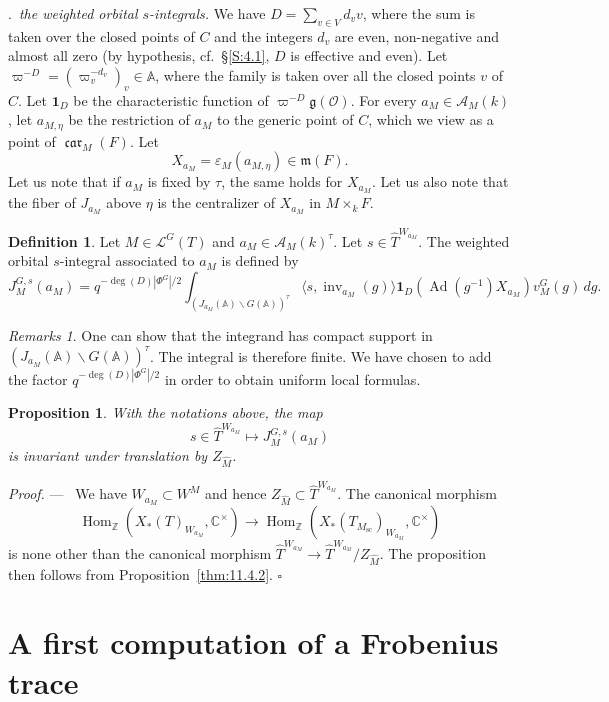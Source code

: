 \documentclass[12pt,a4paper,oneside,english,leqno]{smfart}
\makeatletter
\numberwithin{equation}{subsection}
\newcounter{theo}
\numberwithin{theo}{subsection}
\newenvironment{paragr}[1][]{\medskip\refstepcounter{subsection}%
  \par\noindent\hspace*{\parindent}\thesubsection.\ \emph{#1}%
  \@ifundefined{@empty}{}{}\ignorespaces}{\medskip}
\theoremstyle{plain}
\newtheorem{proposition}[theo]{Proposition}
\theoremstyle{definition}
\newtheorem{definition}[theo]{Definition}
\theoremstyle{remark}
\newtheorem{remarks}[theo]{Remarks}
\newenvironment{preuve}[1][]{\medskip\noindent\textit{Proof.} #1 ---\ }%
  {\hfill\ensuremath{\square}\medskip}
\DeclareMathOperator{\Ad}{Ad}
\DeclareMathOperator{\scnx}{sc}
\DeclareMathOperator{\Hom}{Hom}
\DeclareMathOperator{\inv}{inv}
\DeclareMathOperator{\car}{\mathfrak{car}}
\newcommand{\ZZ}{\mathbb{Z}}
\newcommand{\AAA}{\mathbb{A}}
\newcommand{\CC}{\mathbb{C}}
\newcommand{\oc}{\mathcal{O}}
\newcommand{\lc}{\mathcal{L}}
\newcommand{\Ac}{\mathcal{A}}
\newcommand{\Tc}{\widehat{T}}
\newcommand{\Mc}{\widehat{M}}
\newcommand{\ggo}{\mathfrak{g}}
\newcommand{\mgo}{\mathfrak{m}}
\newcommand{\back}{\backslash}
\newcommand{\bg}{\langle}
\newcommand{\bd}{\rangle}
\makeatother
\begin{document}
\begin{paragr}[the weighted orbital $s$-integrals.]\label{S:11.7}
We have $D=\sum_{v\in V}d_vv$, where the sum is taken over the closed points of $C$ and the integers $d_v$ are even, non-negative and almost all zero (by hypothesis, cf.\ \S\ref{S:4.1}, $D$ is effective and even). Let $\varpi^{-D}=(\varpi_v^{-d_v})_v\in\AAA$, where the family is taken over all the closed points $v$ of $C$. Let $\mathbf{1}_D$ be the characteristic function of $\varpi^{-D}\ggo(\oc)$. For every $a_M\in\Ac_M(k)$, let $a_{M,\eta}$ be the restriction of $a_M$ to the generic point of $C$, which we view as a point of $\car_M(F)$. Let
$$
X_{a_M}=\varepsilon_M(a_{M,\eta})\in\mgo(F).
$$
Let us note that if $a_M$ is fixed by $\tau$, the same holds for $X_{a_M}$. Let us also note that the fiber of $J_{a_M}$ above $\eta$ is the centralizer of $X_{a_M}$ in $M\times_kF$.

\begin{definition}\label{thm:11.7.1}
Let $M\in\lc^G(T)$ and $a_M\in\Ac_M(k)^\tau$. Let $s\in\Tc^{W_{a_M}}$. The weighted orbital $s$-integral associated to $a_M$ is defined by
$$
J_M^{G,s}(a_M)=q^{-\deg(D)|\Phi^G|/2} \int_{(J_{a_M}(\AAA)\back G(\AAA))^\tau}\bg s,\inv_{a_M}(g)\bd \mathbf{1}_D(\Ad(g^{-1})X_{a_M})v_M^G(g)\,dg.
$$
\end{definition}

\begin{remarks}\label{thm:11.7.2}
One can show that the integrand has compact support in $(J_{a_M}(\AAA)\back G(\AAA))^\tau$. The integral is therefore finite. We have chosen to add the factor $q^{-\deg(D)|\Phi^G|/2}$ in order to obtain uniform local formulas.
\end{remarks}

\begin{proposition}\label{thm:11.7.3}
With the notations above, the map
$$
s\in\Tc^{W_{a_M}}\mapsto J_M^{G,s}(a_M)
$$
is invariant under translation by $Z_{\Mc}$.
\end{proposition}

\begin{preuve}
We have $W_{a_M}\subset W^M$ and hence $Z_{\Mc}\subset\Tc^{W_{a_M}}$. The canonical morphism
$$
\Hom_\ZZ(X_*(T)_{W_{a_M}},\CC^\times)\to \Hom_\ZZ(X_*(T_{M_{\scnx}})_{W_{a_M}},\CC^\times)
$$
is none other than the canonical morphism $\Tc^{W_{a_M}}\to\Tc^{W_{a_M}}/Z_{\Mc}$. The proposition then follows from Proposition~\ref{thm:11.4.2}.
\end{preuve}
\end{paragr}
\section{A first computation of a Frobenius trace}\label{sec:12}
\end{document}
